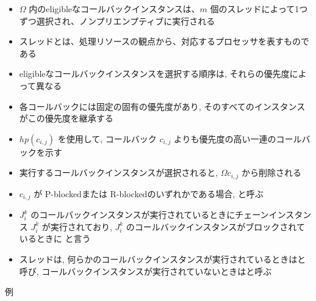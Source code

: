 \begin{frame}{}
    \begin{itemize}
        \item $\Omega$ 内のeligibleなコールバックインスタンスは、$m$ 個のスレッドによって1つずつ選択され、ノンプリエンプティブに実行される
        \item スレッドとは、処理リソースの観点から、対応するプロセッサを表すものである
    \end{itemize}
\end{frame}

\begin{frame}{}
    \begin{itemize}
        \item eligibleなコールバックインスタンスを選択する順序は, それらの優先度によって異なる
        \item 各コールバックには固定の固有の優先度があり, そのすべてのインスタンスがこの優先度を継承する
        \item $h p\left(c_{i, j}\right)$ を使用して, コールバック $c_{i, j}$ よりも優先度の高い一連のコールバックを示す
        \item 実行するコールバックインスタンスが選択されると, $\Omega  c_{i, j}$ から削除される
    \end{itemize}
\end{frame}

\begin{frame}{}
    \begin{itemize}
        \item $c_{i, j}$ が P-blockedまたは R-blockedのいずれかである場合, と呼ぶ
        \item $J_{i}^{k}$ のコールバックインスタンスが実行されているときにチェーンインスタンス $J_{i}^{k}$ が実行されており, $J_{i}^{k}$ のコールバックインスタンスがブロックされているときに と言う
        \item スレッドは, 何らかのコールバックインスタンスが実行されているときはと呼び, コールバックインスタンスが実行されていないときはと呼ぶ
    \end{itemize}
\end{frame}

\begin{frame}{例}
\end{frame}


